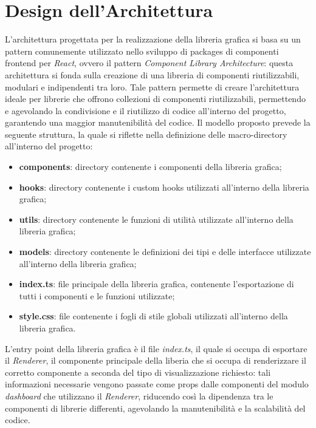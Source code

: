 \section{Design dell'Architettura}
L'architettura progettata per la realizzazione della libreria grafica si basa su un pattern comunemente utilizzato nello sviluppo di packages
di componenti frontend per \textit{React}, ovvero il pattern \textit{Component Library Architecture}: questa architettura si fonda sulla creazione di una libreria di
componenti riutilizzabili, modulari e indipendenti tra loro. \newline
Tale pattern permette di creare l'architettura ideale per librerie che offrono collezioni di componenti riutilizzabili, permettendo e agevolando
la condivisione e il riutilizzo di codice all'interno del progetto, garantendo una maggior manutenibilità del codice. \newline
Il modello proposto prevede la seguente struttura, la quale si riflette nella definizione delle macro-directory all'interno del progetto:
\begin{itemize}
      \item \textbf{components}: directory contenente i componenti della libreria grafica;
      \item \textbf{hooks}: directory contenente i custom hooks utilizzati all'interno della libreria grafica;
      \item \textbf{utils}: directory contenente le funzioni di utilità utilizzate all'interno della libreria grafica;
      \item \textbf{models}: directory contenente le definizioni dei tipi e delle interfacce utilizzate all'interno della libreria grafica;
      \item \textbf{index.ts}: file principale della libreria grafica, contenente l'esportazione di tutti i componenti e le funzioni utilizzate;
      \item \textbf{style.css}: file contenente i fogli di stile globali utilizzati all'interno della libreria grafica.
\end{itemize}
L'entry point della libreria grafica è il file \textit{index.ts}, il quale si occupa di esportare il \textit{Renderer}, il componente principale
della liberia che si occupa di renderizzare il corretto componente a seconda del tipo di visualizzazione richiesto: tali informazioni necessarie
vengono passate come props dalle componenti del modulo \textit{dashboard} che utilizzano il \textit{Renderer}, riducendo così la dipendenza tra le
componenti di librerie differenti, agevolando la manutenibilità e la scalabilità del codice.


